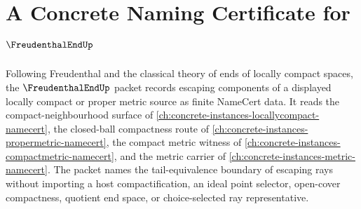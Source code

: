 \chapter{A Concrete Naming Certificate for $\FreudenthalEndUp$}
\label{ch:concrete-instances-freudenthal-end-namecert}

Following Freudenthal and the classical theory of ends of locally compact spaces, the $\FreudenthalEndUp$ packet records escaping components of a displayed locally compact or proper metric source as finite NameCert data. It reads the compact-neighbourhood surface of \autoref{ch:concrete-instances-locallycompact-namecert}, the closed-ball compactness route of \autoref{ch:concrete-instances-propermetric-namecert}, the compact metric witness of \autoref{ch:concrete-instances-compactmetric-namecert}, and the metric carrier of \autoref{ch:concrete-instances-metric-namecert}. The packet names the tail-equivalence boundary of escaping rays without importing a host compactification, an ideal point selector, open-cover compactness, quotient end space, or choice-selected ray representative.

